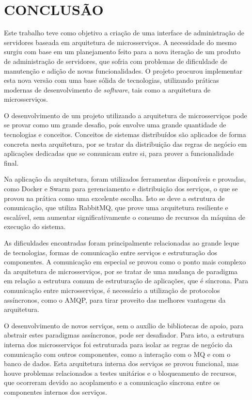 \chapter{CONCLUSÃO}
\label{chp:conclusao}

Este trabalho teve como objetivo a criação de uma interface de administração
de servidores baseada em arquitetura de microsserviços. A necessidade do
mesmo surgiu com base em um planejamento feito para a nova iteração de um
produto de administração de servidores, que sofria com problemas de
dificuldade de manutenção e adição de novas funcionalidades. O projeto
procurou implementar esta nova versão com uma base sólida de tecnologias,
utilizando práticas modernas de desenvolvimento de \emph{software}, tais como
a arquitetura de microsserviços.

O desenvolvimento de um projeto utilizando a arquitetura de microsserviços
pode se provar como um grande desafio, pois envolve uma grande quantidade
de tecnologias e conceitos. Conceitos de sistemas distribuídos são aplicados
de forma concreta nesta arquitetura, por se tratar da distribuição das regras
de negócio em aplicações dedicadas que se comunicam entre si, para prover
a funcionalidade final.

Na aplicação da arquitetura, foram utilizados ferramentas disponíveis e
provadas, como Docker e Swarm para gerenciamento e distribuição dos serviços,
o que se provou na prática como uma excelente escolha. Isto se deve a
estrutura de comunicação, que utiliza RabbitMQ, que prove uma arquitetura
resiliente e escalável, sem aumentar significativamente o consumo de recursos
da máquina de execução do sistema.

As dificuldades encontradas foram principalmente relacionadas ao grande leque
de tecnologias, formas de comunicação entre serviços e estruturação dos
componentes. A comunicação em especial se provou como o ponto mais complexo
da arquitetura de microsserviços, por se tratar de uma mudança de paradigma
em relação a estrutura comum de estruturação de aplicações, que é síncrona.
Para comunicação entre microsserviços, é necessário a utilização de protocolos
assíncronos, como o \ac{AMQP}, para tirar proveito das melhores vantagens
da arquitetura.

O desenvolvimento de novos serviços, sem o auxílio de bibliotecas de apoio,
para abstrair estes paradigmas assíncronos, pode ser desafiador. Para isto,
a estrutura interna dos microsserviços foi estruturada para isolar as regras
de negócio da comunicação com outros componentes, como a interação
com o \ac{MQ} e com o banco de dados. Esta arquitetura interna dos serviços
se provou funcional, mas houve problemas relacionados a testes unitários
e o bloqueamento de recursos, que ocorreram devido ao acoplamento e a
comunicação síncrona entre os componentes internos dos serviços.

